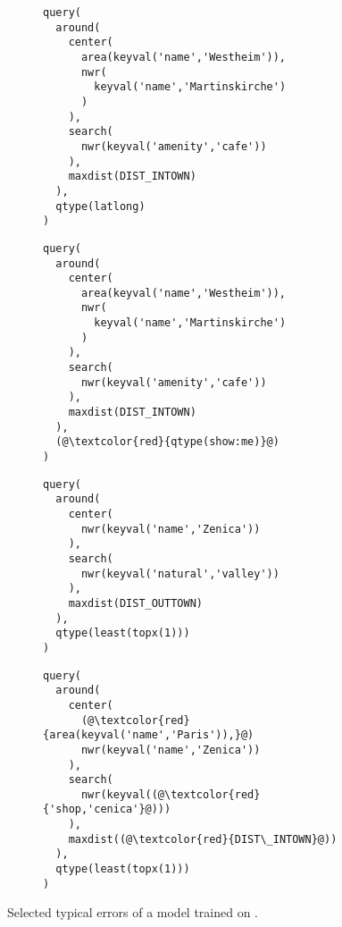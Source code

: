 \begin{figure}[h]
  \centering
  \begin{subfigure}{\textwidth}
    \begin{minipage}{0.48\textwidth}
      \begin{lstlisting}[style=MyMRL,title={Gold MRL},basicstyle={\ttfamily\scriptsize}]
query(
  around(
    center(
      area(keyval('name','Westheim')),
      nwr(
        keyval('name','Martinskirche')
      )
    ),
    search(
      nwr(keyval('amenity','cafe'))
    ),
    maxdist(DIST_INTOWN)
  ),
  qtype(latlong)
)
      \end{lstlisting}
    \end{minipage}
    \hfill
    \begin{minipage}{0.48\textwidth}
      \begin{lstlisting}[style=MyMRL,title={System MRL},basicstyle={\ttfamily\scriptsize{}}]
query(
  around(
    center(
      area(keyval('name','Westheim')),
      nwr(
        keyval('name','Martinskirche')
      )
    ),
    search(
      nwr(keyval('amenity','cafe'))
    ),
    maxdist(DIST_INTOWN)
  ),
  (@\textcolor{red}{qtype(show:me)}@)
)
      \end{lstlisting}
    \end{minipage}
    \caption{}
    \label{fig:cafes-near-martinskirche}
  \end{subfigure}
  \begin{subfigure}{\textwidth}
    \begin{minipage}{0.48\textwidth}
      \begin{lstlisting}[style=MyMRL,title={Gold MRL},basicstyle={\ttfamily\scriptsize}]
query(
  around(
    center(
      nwr(keyval('name','Zenica'))
    ),
    search(
      nwr(keyval('natural','valley'))
    ),
    maxdist(DIST_OUTTOWN)
  ),
  qtype(least(topx(1)))
)
      \end{lstlisting}
    \end{minipage}
    \hfill
    \begin{minipage}{0.48\textwidth}
      \begin{lstlisting}[style=MyMRL,title={System MRL},basicstyle={\ttfamily\scriptsize{}}]
query(
  around(
    center(
      (@\textcolor{red}{area(keyval('name','Paris')),}@)
      nwr(keyval('name','Zenica'))
    ),
    search(
      nwr(keyval((@\textcolor{red}{'shop,'cenica'}@)))
    ),
    maxdist((@\textcolor{red}{DIST\_INTOWN}@))
  ),
  qtype(least(topx(1)))
)
      \end{lstlisting}
    \end{minipage}
    \caption{}
    \label{fig:valleys-around-zenica}
  \end{subfigure}
  \caption[Errors after \nlmapstwo{} training]{Selected typical errors of a
    model trained on \nlmapstwo{}.}
  \label{fig:nlmaps-v2-reality-check}
\end{figure}

